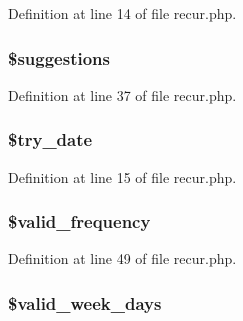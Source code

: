 \-Definition at line 14 of file recur.\-php.

\hypertarget{class_when_a435c7a87a97b0b448a1920488dd592da}{
\subsubsection[{\$suggestions}]{\setlength{\rightskip}{0pt plus 5cm}\$suggestions}}\label{class_when_a435c7a87a97b0b448a1920488dd592da}


\-Definition at line 37 of file recur.\-php.

\hypertarget{class_when_ac726436e39cc7252cd1ca6c0f636f15b}{
\subsubsection[{\$try\-\_\-date}]{\setlength{\rightskip}{0pt plus 5cm}\$try\-\_\-date}}\label{class_when_ac726436e39cc7252cd1ca6c0f636f15b}


\-Definition at line 15 of file recur.\-php.

\hypertarget{class_when_a8cf1751bccbd1e4e79d83d6ced43d055}{
\subsubsection[{\$valid\-\_\-frequency}]{\setlength{\rightskip}{0pt plus 5cm}\$valid\-\_\-frequency}}\label{class_when_a8cf1751bccbd1e4e79d83d6ced43d055}


\-Definition at line 49 of file recur.\-php.

\hypertarget{class_when_abc38cc338d7a6772a037b000bd3c6fb9}{
\subsubsection[{\$valid\-\_\-week\-\_\-days}]{\setlength{\rightskip}{0pt plus 5cm}\$valid\-\_\-week\-\_\-days}}\label{class_when_abc38cc338d7a6772a037b000bd3c6fb9}


